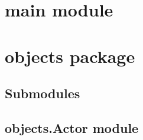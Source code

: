 \documentclass[letterpaper,10pt,english]{sphinxmanual}
\begin{document}
\section{main module}
\label{\detokenize{main:main-module}}\label{\detokenize{main::doc}}
\sphinxstepscope


\section{objects package}
\label{\detokenize{objects:objects-package}}\label{\detokenize{objects::doc}}

\subsection{Submodules}
\label{\detokenize{objects:submodules}}

\subsection{objects.Actor module}
\label{\detokenize{objects:module-objects.Actor}}\label{\detokenize{objects:objects-actor-module}}
\end{document}
